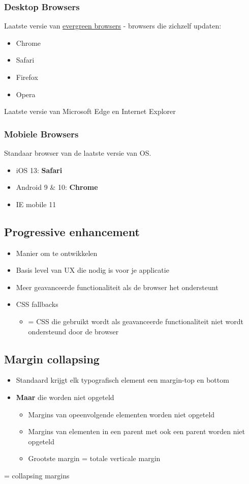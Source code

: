 \documentclass{article}
\newcommand{\bold}[1]{\textbf{#1}}
\begin{document}
\subsubsection{Desktop Browsers}
Laatste versie van \underline{evergreen browsers} - browsers die zichzelf updaten:
\begin{itemize}
    \item Chrome
    \item Safari
    \item Firefox
    \item Opera
\end{itemize}

Laatste versie van Microsoft Edge en Internet Explorer

\subsubsection{Mobiele Browsers}
Standaar browser van de laatste versie van OS.
\begin{itemize}
    \item iOS 13: \bold{Safari}
    \item Android 9 \& 10: \bold{Chrome}
    \item IE mobile 11
\end{itemize}

\subsection{Progressive enhancement}
\begin{itemize}
    \item Manier om te ontwikkelen
    \item Basis level van UX die nodig is voor je applicatie
    \item Meer geavanceerde functionaliteit als de browser het ondersteunt
    \item CSS fallbacks
    \begin{itemize}
        \item = CSS die gebruikt wordt als geavanceerde functionaliteit niet wordt ondersteund door de browser
    \end{itemize}
\end{itemize}

\subsection{Margin collapsing}
\begin{itemize}
    \item Standaard krijgt elk typografisch element een margin-top en bottom
    \item \bold{Maar} die worden niet opgeteld
    \begin{itemize}
        \item Margins van opeenvolgende elementen worden niet opgeteld
        \item Margins van elementen in een parent met ook een parent worden niet opgeteld
        \item Grootste margin = totale verticale margin
    \end{itemize}
\end{itemize}
= collapsing margins
\end{document}
